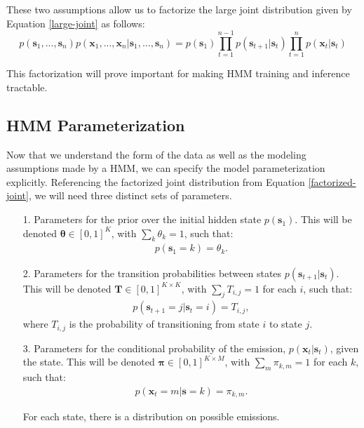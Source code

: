 
          These two assumptions allow us to factorize the large joint distribution given by Equation \ref{large-joint} as follows:
\begin{equation} \label{factorized-joint}
	p(\textbf{s}_1, ..., \textbf{s}_n) p(\textbf{x}_1, ..., \textbf{x}_n | \textbf{s}_1, ..., \textbf{s}_n) = p(\textbf{s}_1) \prod_{t=1}^{n-1} p(\textbf{s}_{t+1} | \textbf{s}_t) \prod_{t=1}^{n} p(\textbf{x}_t | \textbf{s}_t)
      \end{equation}
      
This factorization will prove important for making HMM training and inference tractable.

\subsection{HMM Parameterization}

Now that we understand the form of the data as well as the modeling assumptions made by a HMM, we can specify the model parameterization explicitly. Referencing the factorized joint distribution from Equation \ref{factorized-joint}, we will need three distinct sets of parameters.
%
\begin{itemize}
	\item[1.]  Parameters for the prior over the initial hidden state $p(\textbf{s}_1)$. This will be denoted $\boldsymbol{\theta} \in [0,1]^{K}$, with $\sum_k\theta_k=1$, such that:
	\begin{align*}
		p(\textbf{s}_1 = k) = \theta_k.
	\end{align*}
%
	\item[2.] Parameters for the transition probabilities between states $p(\textbf{s}_{t+1} | \textbf{s}_t)$. This will be denoted $\textbf{T} \in [0,1]^{K \times K}$, with $\sum_j T_{i,j}=1$ for each $i$, such that:
	\begin{align*}
		p(\textbf{s}_{t+1} = j | \textbf{s}_t = i) = T_{i,j},
	\end{align*}
	where $T_{i,j}$ is the probability of transitioning from state $i$ to state $j$.
%
	\item[3.] Parameters for the conditional probability of the emission, $p(\textbf{x}_t | \textbf{s}_t)$,  given the state. This will be denoted $\boldsymbol{\pi} \in [0,1]^{K \times M}$, with $\sum_m \pi_{k,m}=1$ for each $k$, such that:
	\begin{align*}
		p(\textbf{x}_t = m | \textbf{s} = k) = \pi_{k, m}.
	\end{align*}

	For each state, there is a distribution on possible emissions.
\end{itemize}

